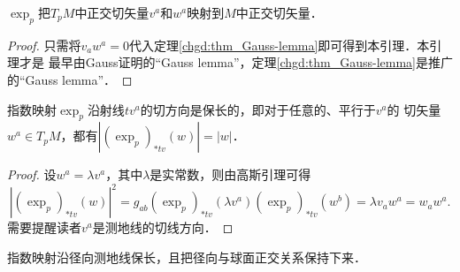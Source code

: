 %


\begin{lemma}\label{chgd:thm_Gauss-lemma-old}
    $\exp_{p}$把$T_pM$中正交切矢量$v^a$和$w^a$映射到$M$中正交切矢量．
\end{lemma}
\begin{proof}
    只需将$v_aw^a=0$代入定理\ref{chgd:thm_Gauss-lemma}即可得到本引理．本引理才是
    最早由Gauss证明的“Gauss lemma”，定理\ref{chgd:thm_Gauss-lemma}是推广的“Gauss lemma”．
\end{proof}

\begin{proposition}\label{chgd:thm_Gauss-lemma-baochang}
    指数映射$\exp_{p}$沿射线$tv^a$的切方向是保长的，即对于任意的、平行于$v^a$的
    切矢量$w^a\in T_pM$，都有$|(\exp_{p})_{*tv}(w)|=|w|$．
\end{proposition}
\begin{proof}
    设$w^a= \lambda v^a$，其中$\lambda$是实常数，则由高斯引理可得
    \begin{equation*}
        |(\exp_{p})_{*tv}(w)|^2 = g_{ab}(\exp_{p})_{*tv}(\lambda v^a) (\exp_{p})_{*tv}(w^b)
        = \lambda v_a w^a = w_a w^a.
    \end{equation*}
    需要提醒读者$v^a$是测地线的切线方向．
\end{proof}

\begin{remark}\label{chgd:rmk_Gauss-lemma}
	指数映射沿径向测地线保长，且把径向与球面正交关系保持下来．
\end{remark}

